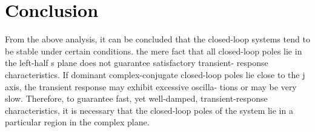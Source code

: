 \documentclass[12pt]{article}
\begin{document}
\section*{\textcolor{black}{Conclusion}}
From the above analysis, it can be concluded that the closed-loop systems tend to be stable under certain conditions. the mere fact that all closed-loop poles lie in the left-half s plane does not guarantee satisfactory transient- response characteristics. If dominant complex-conjugate closed-loop poles lie close to the j axis, the transient response may exhibit excessive oscilla- tions or may be very slow. Therefore, to guarantee fast, yet well-damped, transient-response characteristics, it is necessary that the closed-loop poles of the system lie in a particular region in the complex plane.
 \pagebreak
\end{document}
